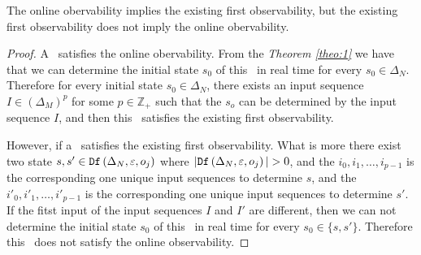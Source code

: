 \begin{theorem}
The online obervability implies the existing first observability, but the existing first observability does not imply the online obervability.
\label{theo:2}
\end{theorem}
\begin{proof}
A \BCN\ satisfies the online obervability. From the {\em Theorem \ref{theo:1}} we have that we can determine the initial state $s_0$ of this \BCN\ in real time for every $s_0\in \Delta_N$. Therefore for every initial state $s_0 \in \Delta_N$, there exists an input sequence $I\in(\Delta_M)^p$ for some $p\in \mathbb{Z}_+$ such that the $s_o$ can be determined by the input sequence $I$, and then this \BCN\ satisfies the existing first observability.

However, if a \BCN\ satisfies the existing first observability. What is more there exist two state $s, s'\in{\tt Df}\left(\Delta_N,\varepsilon, o_j\right)$ where $|\Ded\left(\Delta_N,\varepsilon, o_j\right)|> 0$, and the $i_0, i_1,\ldots, i_{p-1}$ is the corresponding one unique input sequences to determine $s$, and the $i'_0, i'_1,\ldots, i'_{p-1}$ is the corresponding one unique input sequences to determine $s'$. If the fitst input of the input sequences $I$ and $I'$ are different, then we can not determine the initial state $s_0$ of this \BCN\ in real time for every $s_0\in \{s,s'\}$. Therefore this \BCN\ does not satisfy the online observability.
\end{proof}


